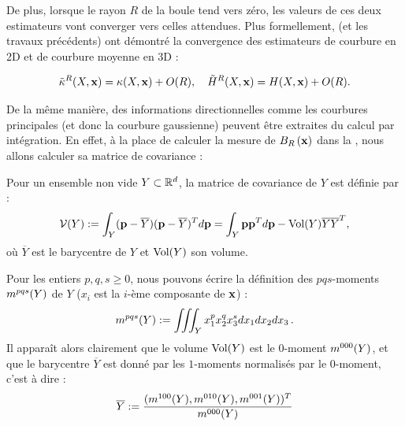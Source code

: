 %
De plus, lorsque le rayon $R$ de la boule tend vers zéro, les valeurs de ces
deux estimateurs vont converger vers celles attendues. Plus formellement,
 (et les travaux précédents) ont démontré la
convergence des estimateurs de courbure en 2D et de courbure moyenne en 3D :
%
\begin{theorem}{}
  \label{theo:pottmann-2d-3d-mean-conv}
  \begin{equation}
    \tilde{\kappa}^{R}(X,\mathbf{x}) = \kappa(X,\mathbf{x}) + O(R),
    \quad\tilde{H}^{R}(X,\mathbf{x}) = H(X,\mathbf{x}) + O(R).
  \end{equation}
\end{theorem}
%
De la même manière, des informations directionnelles comme les courbures
principales (et donc la courbure gaussienne) peuvent être extraites du calcul
par intégration. En effet, à la place de calculer la mesure de $B_{R}\left(\mathbf{x}\right)$
dans la , nous allons calculer sa matrice
de covariance :
%
\begin{definition}
  \label{def:cov-matrix}
  Pour un ensemble non vide $Y \subset \mathbb{R}^d$, la matrice de covariance de $Y$
  est définie par :
  \begin{equation}
    \mathcal{V}(Y) := \int_Y (\mathbf{p}-\overline{Y})(\mathbf{p}-\overline{Y})^T d\mathbf{p} = \int_Y \mathbf{p} \mathbf{p}^T d\mathbf{p} - \mathrm{Vol}(Y)\overline{Y}\overline{Y}^T,
  \end{equation}
  où $\overline{Y}$ est le barycentre de $Y$ et $\mathrm{Vol}(Y)$ son volume.
\end{definition}
%
Pour les entiers $p, q, s \ge 0$, nous pouvons écrire la définition des $
pqs$-moments $m^{pqs}(Y)$ de $Y$ ($x_i$ est la $i$-ème composante de $\mathbf{x}$) :
%
\begin{equation}
  \label{eq:moments}
  m^{pqs}(Y) := \iiint_Y x_1^p x_2^q x_3^s dx_1 dx_2 dx_3\,.
\end{equation}
%
Il apparaît alors clairement que le volume $\mathrm{Vol}(Y)$ est le $0$-moment
$m^{000}(Y)$, et que le barycentre $\overline{Y}$ est donné par les $1$-moments
normalisés par le $0$-moment, c'est à dire :
%
\begin{equation}
  \overline{Y} := \frac{( m^{100}(Y), m^{010}(Y), m^{001}(Y) )^T}{m^{000}(Y)}
\end{equation}

